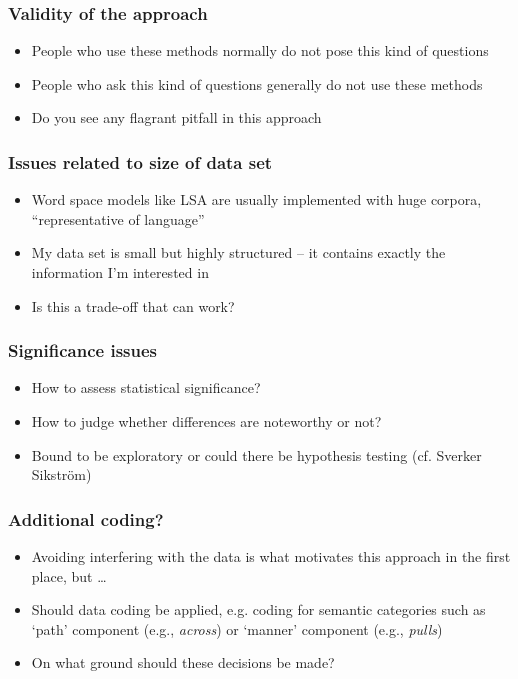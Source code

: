 \documentclass[]{beamer}
\begin{document}
\begin{frame}
	\frametitle{Validity of the approach}
	\begin{itemize}
	\item People who use these methods normally do not pose this kind of questions
	\item People who ask this kind of questions generally do not use these methods
	\item Do you see any flagrant pitfall in this approach
	\end{itemize}
\end{frame}


\begin{frame}
	\frametitle{Issues related to size of data set}
	\begin{itemize}
	\item Word space models like LSA are usually implemented with huge corpora, ``representative of language''
	\item My data set is small but highly structured -- it contains exactly the information I'm interested in
	\item Is this a trade-off that can work?
	\end{itemize}
\end{frame}


\begin{frame}
	\frametitle{Significance issues}
	\begin{itemize}
		\item How to assess statistical significance?
		\item How to judge whether differences are noteworthy or not?
		\item Bound to be exploratory or could there be hypothesis testing (cf. Sverker Sikstr\"{o}m)
	\end{itemize}
\end{frame}


\begin{frame}
	\frametitle{Additional coding?}
	\begin{itemize}
		\item Avoiding interfering with the data is what motivates this approach in the first place, but \ldots
		\item Should data coding be applied, e.g. coding for semantic categories such as `path'  component (e.g., \emph{across}) or `manner' component (e.g., \emph{pulls})
		\item On what ground should these decisions be made?
	\end{itemize}
\end{frame}
\end{document}
